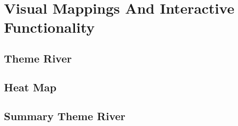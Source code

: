 \chapter{Visual Mappings And Interactive Functionality}
\section{Theme River}
\section{Heat Map}
\section{Summary Theme River}